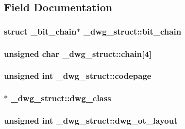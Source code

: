 \subsection{\-Field \-Documentation}
\hypertarget{struct__dwg__struct_a6d53dae2c490f49529614c90408038b0}{
\subsubsection[{bit\-\_\-chain}]{\setlength{\rightskip}{0pt plus 5cm}struct {\bf \-\_\-bit\-\_\-chain}$\ast$ {\bf \-\_\-dwg\-\_\-struct\-::bit\-\_\-chain}}}\label{struct__dwg__struct_a6d53dae2c490f49529614c90408038b0}
\hypertarget{struct__dwg__struct_a4c2a01b817d4b09cff4a86d22847bc0d}{
\subsubsection[{chain}]{\setlength{\rightskip}{0pt plus 5cm}unsigned char {\bf \-\_\-dwg\-\_\-struct\-::chain}\mbox{[}4\mbox{]}}}\label{struct__dwg__struct_a4c2a01b817d4b09cff4a86d22847bc0d}
\hypertarget{struct__dwg__struct_acf3fb73d5fa22acc30308a90d891b845}{
\subsubsection[{codepage}]{\setlength{\rightskip}{0pt plus 5cm}unsigned int {\bf \-\_\-dwg\-\_\-struct\-::codepage}}}\label{struct__dwg__struct_acf3fb73d5fa22acc30308a90d891b845}
\hypertarget{struct__dwg__struct_a948d900bce7d1e932a30ed40104fae5b}{
\subsubsection[{dwg\-\_\-class}]{$\ast$ {\bf \-\_\-dwg\-\_\-struct\-::dwg\-\_\-class}}}\label{struct__dwg__struct_a948d900bce7d1e932a30ed40104fae5b}
\hypertarget{struct__dwg__struct_a9f1f6f7d09e157d1f25a0f1bf09785c4}{
\subsubsection[{dwg\-\_\-ot\-\_\-layout}]{\setlength{\rightskip}{0pt plus 5cm}unsigned int {\bf \-\_\-dwg\-\_\-struct\-::dwg\-\_\-ot\-\_\-layout}}}\label{struct__dwg__struct_a9f1f6f7d09e157d1f25a0f1bf09785c4}
